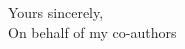 \documentclass[11pt]{letter}
\begin{document}
\begin{letter}{}



\closing{Yours sincerely,\\On behalf of my co-authors}

\end{letter}
\end{document}
